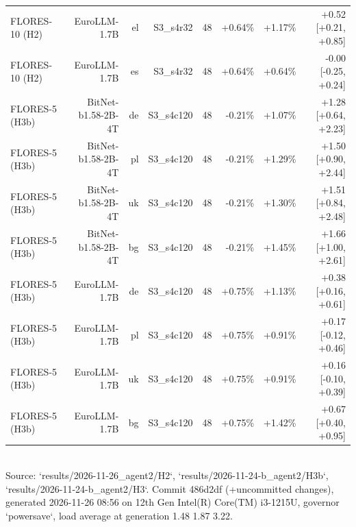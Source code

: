 \begin{table}[t]
\begin{tabular}{lrrrrrrr}
FLORES-10 (H2) & EuroLLM-1.7B & el & S3\_s4r32 & 48 & +0.64\% & +1.17\% & +0.52 [+0.21, +0.85] \\
FLORES-10 (H2) & EuroLLM-1.7B & es & S3\_s4r32 & 48 & +0.64\% & +0.64\% & -0.00 [-0.25, +0.24] \\
FLORES-5 (H3b) & BitNet-b1.58-2B-4T & de & S3\_s4c120 & 48 & -0.21\% & +1.07\% & +1.28 [+0.64, +2.23] \\
FLORES-5 (H3b) & BitNet-b1.58-2B-4T & pl & S3\_s4c120 & 48 & -0.21\% & +1.29\% & +1.50 [+0.90, +2.44] \\
FLORES-5 (H3b) & BitNet-b1.58-2B-4T & uk & S3\_s4c120 & 48 & -0.21\% & +1.30\% & +1.51 [+0.84, +2.48] \\
FLORES-5 (H3b) & BitNet-b1.58-2B-4T & bg & S3\_s4c120 & 48 & -0.21\% & +1.45\% & +1.66 [+1.00, +2.61] \\
FLORES-5 (H3b) & EuroLLM-1.7B & de & S3\_s4c120 & 48 & +0.75\% & +1.13\% & +0.38 [+0.16, +0.61] \\
FLORES-5 (H3b) & EuroLLM-1.7B & pl & S3\_s4c120 & 48 & +0.75\% & +0.91\% & +0.17 [-0.12, +0.46] \\
FLORES-5 (H3b) & EuroLLM-1.7B & uk & S3\_s4c120 & 48 & +0.75\% & +0.91\% & +0.16 [-0.10, +0.39] \\
FLORES-5 (H3b) & EuroLLM-1.7B & bg & S3\_s4c120 & 48 & +0.75\% & +1.42\% & +0.67 [+0.40, +0.95] \\
\bottomrule\end{tabular}
\\[2pt]{\scriptsize Source: `results/2026-11-26\_agent2/H2`, `results/2026-11-24-b\_agent2/H3b`, `results/2026-11-24-b\_agent2/H3`. Commit 486d2df (+uncommitted changes), generated 2026-11-26 08:56 on 12th Gen Intel(R) Core(TM) i3-1215U, governor `powersave`, load average at generation 1.48 1.87 3.22.}
\end{table}

